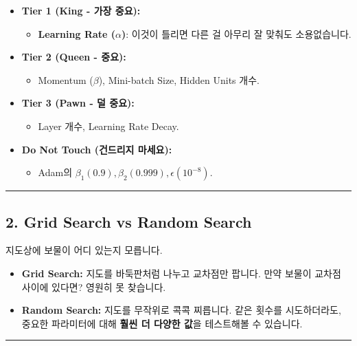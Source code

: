 \documentclass[11pt,a4paper]{book}
\theoremstyle{definition}
\begin{document}
\begin{itemize}
    \item \textbf{Tier 1 (King - 가장 중요):}
    \begin{itemize}
        \item \textbf{Learning Rate ($\alpha$)}: 이것이 틀리면 다른 걸 아무리 잘 맞춰도 소용없습니다.
    \end{itemize}
    \item \textbf{Tier 2 (Queen - 중요):}
    \begin{itemize}
        \item Momentum ($\beta$), Mini-batch Size, Hidden Units 개수.
    \end{itemize}
    \item \textbf{Tier 3 (Pawn - 덜 중요):}
    \begin{itemize}
        \item Layer 개수, Learning Rate Decay.
    \end{itemize}
    \item \textbf{Do Not Touch (건드리지 마세요):}
    \begin{itemize}
        \item Adam의 $\beta_1(0.9), \beta_2(0.999), \epsilon(10^{-8})$.
    \end{itemize}
\end{itemize}

\vspace{0.5cm}\hrule\vspace{0.5cm}

\subsection{2. Grid Search vs Random Search}


\begin{analogybox}[title={보물 찾기}]
지도상에 보물이 어디 있는지 모릅니다.
\begin{itemize}
    \item \textbf{Grid Search:} 지도를 바둑판처럼 나누고 교차점만 팝니다. 만약 보물이 교차점 사이에 있다면? 영원히 못 찾습니다.
    \item \textbf{Random Search:} 지도를 무작위로 콕콕 찌릅니다. 같은 횟수를 시도하더라도, 중요한 파라미터에 대해 \textbf{훨씬 더 다양한 값}을 테스트해볼 수 있습니다.
\end{itemize}
\end{analogybox}

\vspace{0.5cm}\hrule\vspace{0.5cm}
\end{document}
